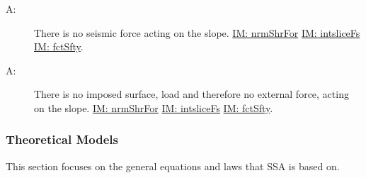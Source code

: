 \documentclass[12pt]{article}
\newcounter{assumpnum}
\newcommand{\atheassumpnum}{A\theassumpnum}
\begin{document}
\begin{description}
\item[\atheassumpnum\label{A:Seismic-Force}:]There is no seismic force acting on the slope. \hyperref[IM:nrmShrFor]{IM: nrmShrFor} \hyperref[IM:intsliceFs]{IM: intsliceFs} \hyperref[IM:fctSfty]{IM: fctSfty}.
\end{description}
\begin{description}
\item[\atheassumpnum\label{A:Surface-Load}:]There is no imposed surface, load and therefore no external force, acting on the slope. \hyperref[IM:nrmShrFor]{IM: nrmShrFor} \hyperref[IM:intsliceFs]{IM: intsliceFs} \hyperref[IM:fctSfty]{IM: fctSfty}.
\end{description}
\subsubsection{Theoretical Models}
\label{Sec:TMs}
This section focuses on the general equations and laws that SSA is based on.
~\newline
\end{document}
